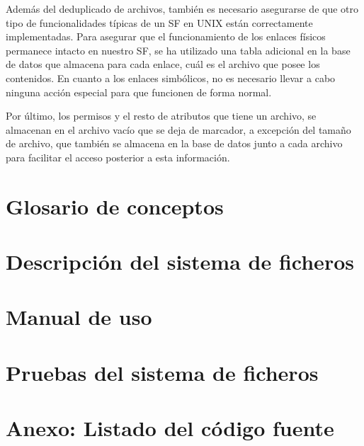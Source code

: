 \documentclass[12pt,a4paper]{article}
\begin{document}
Además del deduplicado de archivos, también es necesario asegurarse de que otro tipo de funcionalidades típicas de un SF en UNIX están correctamente implementadas. Para asegurar que el funcionamiento de los enlaces físicos permanece intacto en nuestro SF, se ha utilizado una tabla adicional en la base de datos que almacena para cada enlace, cuál es el archivo que posee los contenidos. En cuanto a los enlaces simbólicos, no es necesario llevar a cabo ninguna acción especial para que funcionen de forma normal.

Por último, los permisos y el resto de atributos que tiene un archivo, se almacenan en el archivo vacío que se deja de marcador, a excepción del tamaño de archivo, que también se almacena en la base de datos junto a cada archivo para facilitar el acceso posterior a esta información.

\newpage
\section{Glosario de conceptos}

\newpage
\section{Descripción del sistema de ficheros}

\newpage
\section{Manual de uso}

\newpage
\section{Pruebas del sistema de ficheros}

\newpage
\section{Anexo: Listado del código fuente}

\iffalse 
\begin{figure}[h!]
  \centering
  \label{fig:supervisiontree}
  \texttt{[image: supervisiontree]}
  \caption{Árbol de supervisión}
\end{figure}
\fi


\iffalse
\lstdefinestyle{mystyle}{language=Pascal,
  breakatwhitespace=false,
  breaklines=true,
  basicstyle=\footnotesize
}
\begin{mycode}
1> application:start(otpapp).
Iniciado supervisor s1
Iniciado supervisor s2
Iniciado worker w2A 
Iniciado worker w2B 
Iniciado supervisor s3
Iniciado worker w3A 
Iniciado supervisor s5
Iniciado worker w5A 
Iniciado worker w5B 
Iniciado worker w5C 
Iniciado supervisor s4
Iniciado worker w4A 
Iniciado worker w4B 
ok
\end{mycode}
\fi
\end{document}
